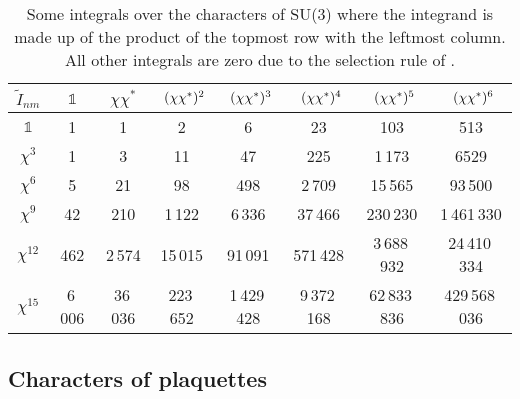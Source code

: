 \begin{table}
  \begin{center}
    \begin{tabular}{*8c} \toprule
      {$\tilde{I}_{nm}$} & $\mathbb{1}$ & $\chi\chi^*$ & $(\chi\chi^*)\mathrlap{^2}$ & $(\chi\chi^*)\mathrlap{^3}$ 
        & $(\chi\chi^*)\mathrlap{^4}$ & $(\chi\chi^*)\mathrlap{^5}$ & $(\chi\chi^*)\mathrlap{^6}$ \\\midrule
      $\mathbb{1}$ & 1 & 1 & 2 & 6 & 23 & 103 & 513 \\
      $\chi^3$ & 1 & 3 & 11 & 47 & 225 & 1\,173 & 6529 \\
      $\chi^6$ & 5 & 21 & 98 & 498 & 2\,709 & 15\,565 & 93\,500 \\
      $\chi^9$ & 42 & 210 & 1\,122 & 6\,336 & 37\,466 & 230\,230 & 1\,461\,330 \\
      $\chi^{12}$ & 462 & 2\,574 & 15\,015 & 91\,091 & 571\,428  & 3\,688\,932 & 24\,410\,334 \\
      $\chi^{15}$ & 6\,006 & 36\,036 & 223\,652 & 1\,429\,428 & 9\,372\,168 & 62\,833\,836 & 429\,568\,036 \\\bottomrule
    \end{tabular}
  \end{center}
  \caption{Some integrals over the characters of SU($3$) where the integrand is made
    up of the product of the topmost row with the leftmost column. All other
    integrals are zero due to the selection rule of
    \protect{}.}
  \label{tab:character-integrals}
\end{table}

\subsection{Characters of plaquettes}

